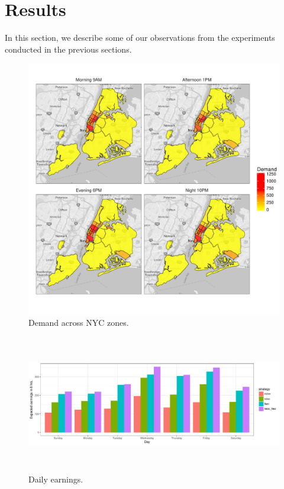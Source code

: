 
\section{Results}
\label{sec:results}


In this section, we describe some of our observations from the experiments conducted in the previous sections.


\begin{figure}
	\label{fig:demand_heatmap}
	\centering
	\caption{Demand across NYC zones.}
	\includegraphics[scale=0.4]{figures/demand_heatmap.pdf}
\end{figure}

\begin{figure}
	\label{fig:daily_earnings}
	\caption{Daily earnings.}
	\includegraphics[width=\textwidth,height=6cm]{figures/daily_earnings.pdf}
\end{figure}

